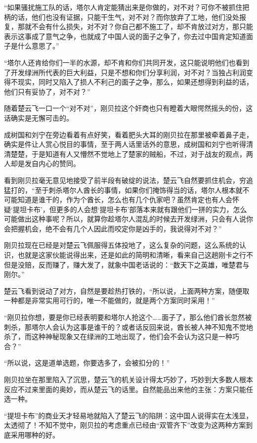 “如果骚扰施工队的话，塔尔人肯定能猜出来是你做的，对不对？可你不被抓住把柄的话，他们也没有证据，只能干生气，对不对？而你放弃了工地，他们没处报复，那就不会有什么损失，对不对？你自己都不施工了，却不肯放过对方，那只能表示这事成了意气之争，也就成了中国人说的面子之争了，你去过中国肯定知道面子是什么意思了。”

“塔尔人还肯给你们一半的水源，却不肯和你们共同开发，这只能说明他们也看到了开发绿洲所代表的巨大利益，只是不想和你们分享利润，对不对？当独占利润变得不现实，同时又陷入了损人不利己的面子之争，那么，如果还想得到利益的话，他们只有妥协了，对不对？”

随着楚云飞一口一个“对不对”，刚贝拉这个奸商也只有瞪着大眼愕然摇头的份，这话确实是无懈可击的。

成树国和刘宁在旁边看着有点好笑，看着肥头大耳的刚贝拉在那里被牵着鼻子走，确实是件让人赏心悦目的事情，至于两人话里话外的意思，成树国和刘宁也听得清清楚楚，于是知道有人又懵然不觉地上了楚家的贼船，不过，对于战友的观点，两人却是发自内心的赞同。

看到刚贝拉毫无意见地接受了前半段有破绽的说法，楚云飞自然要抓住机会，穷追猛打的，“至于刺杀塔尔人酋长的事情，如果你们掩饰得当的话，塔尔人根本就不可能知道是谁干的，作为个酋长，怎么也有几个仇家吧？虽然肯定也有人会怀疑‘提坦卡布’，但更多的人会想‘提坦卡布’部落本来就有跟他们一拼的实力，怎么可能做出这种事呢？所以，就算你趁塔尔人混乱的时候去开发绿洲，只会有人说你会把握机会，绝不会有几个人因此而咬定你是凶手的，我说得对不对？”

刚贝拉现在已经是对楚云飞佩服得五体投地了，这么复杂的问题，这么系统的认识，也就是这家伙能说得出来，还是如此的简明和清晰，看来自己这趟刚卡之行不但是没赔，反而赚了，赚大发了，就象中国老话说的：“数天下之英雄，唯楚君与刚尔。”

楚云飞看到说动了对方，自然是要趁热打铁的，“所以说，上面两种方案，随便取一种都是非常实用可行的，唯一不能做的，就是两个方案同时采用！”

“刚贝拉你想，要是你已经表明要和塔尔人抢这个……面子了，那么他们酋长忽然被刺杀，那塔尔人会认为这事是谁干的？或者话反回来说，酋长被人神不知鬼不觉地杀了，而这种神秘现象又在绿洲的工地出现了，他们会不会认为这只是一种巧合？”

“所以说，这是道单选题，你要选多了，会被扣分的！”

刚贝拉坐在那里陷入了沉思，楚云飞的机关设计得太巧妙了，巧妙到大多数人根本反应不过来里面的奥妙，而从楚云飞的话里。自然能品出来他的主张：方案只能任选一种。

“提坦卡布”的商业天才轻易地就陷入了楚云飞的陷阱：这中国人说得实在太浅显，太透彻了！不知不觉中，刚贝拉的考虑重点已经由“双管齐下”改变为这两种方案到底采用哪种的好。


